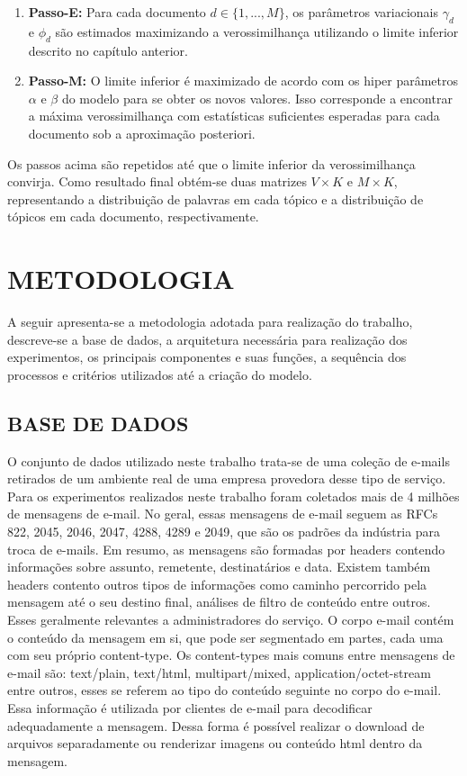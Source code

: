 \documentclass[12pt,a4paper]{article}
\begin{document}
\begin{enumerate}
\item \textbf{Passo-E:} Para cada documento $d \in \{1,. . . , M\}$, os parâmetros variacionais $\gamma_d$ e $\phi_d$ são estimados maximizando a verossimilhança utilizando o limite inferior descrito no capítulo anterior.
\item \textbf{Passo-M:} O limite inferior é maximizado  de acordo com os hiper parâmetros $\alpha$ e $\beta$ do modelo para se obter os novos valores. 
 Isso corresponde a encontrar a máxima verossimilhança com estatísticas suficientes esperadas para cada documento sob a aproximação posteriori.
\end{enumerate}

Os passos acima são repetidos até que o limite inferior da verossimilhança convirja. Como resultado final obtém-se duas matrizes $V \times K$ e $M \times K$,
 representando  a distribuição de palavras em cada tópico e a distribuição de tópicos em cada documento, respectivamente.



\section{METODOLOGIA} \label{sec:metodologia}

A seguir apresenta-se a metodologia adotada para realização do trabalho, descreve-se a base de dados, a arquitetura necessária 
 para realização dos experimentos, os principais componentes e suas funções, a sequência dos processos e critérios utilizados até a criação do modelo.

\subsection{BASE DE DADOS} \label{sec:base-de-dados}

O conjunto de dados utilizado neste trabalho trata-se de uma coleção de e-mails retirados de um ambiente real de uma empresa provedora desse tipo de serviço. 
 Para os experimentos realizados neste trabalho foram coletados mais de 4 milhões de mensagens de e-mail. No geral, essas mensagens de e-mail seguem as RFCs 822, 2045, 2046, 2047, 4288, 4289 e 2049,
 que são os padrões da indústria para troca de e-mails.	Em resumo, as mensagens são formadas por headers contendo informações sobre assunto, remetente, destinatários e data.
 Existem também headers contento outros tipos de informações como caminho percorrido pela mensagem até o seu destino final, análises de filtro de conteúdo entre outros. Esses geralmente relevantes a administradores do serviço. O corpo e-mail contém o conteúdo da mensagem em si, que pode ser segmentado em  partes, cada uma com seu próprio content-type. 
 Os content-types mais comuns entre mensagens de e-mail são: text/plain, text/html, multipart/mixed, application/octet-stream entre outros, esses se referem ao tipo do conteúdo seguinte no corpo do e-mail.
 Essa informação é utilizada por clientes de e-mail para decodificar adequadamente a mensagem. Dessa forma é possível realizar o download de arquivos separadamente ou renderizar imagens ou conteúdo html dentro da mensagem.
\end{document}
